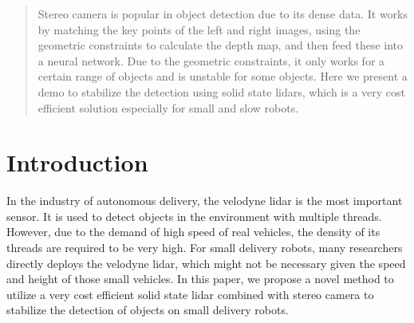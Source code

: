 \documentclass[balance,upint,subscriptcorrection,varvw,nofoot, mathalfa=cal=boondoxo,spanish,french,vietnamese,russian,greek,pdf-a,fontspec,colorlinks]{asmeconf}
\begin{document}




\begin{abstract}

Stereo camera is popular in object detection due to its dense data. It works by matching
the key points of the left and right images, using the geometric constraints to calculate
the depth map, and then feed these into a neural network. Due to the geometric
constraints, it only works for a certain range of objects and is unstable for some objects.
Here we present a demo to stabilize the detection using solid state lidars, which is a very
cost efficient solution especially for small and slow robots.
\end{abstract}






\section{Introduction}
In the industry of autonomous delivery, the velodyne lidar is the most important sensor. It is used to detect objects in the environment with multiple threads. However, due to the demand of high speed of real vehicles, the density of its threads are required to be very high. For small delivery robots, many researchers directly deploys the velodyne lidar, which might not be necessary given the speed and height of those small vehicles. In this paper, we propose a novel method to utilize a very cost efficient solid state lidar combined with stereo camera to stabilize the detection of objects on small delivery robots.
\end{document}

